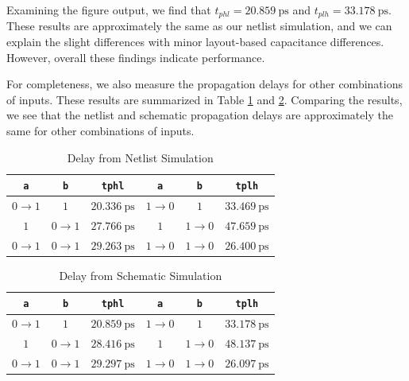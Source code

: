\documentclass{article}
\begin{document}
	\noindent Examining the figure output, we find that $t_{phl} = 20.859\ \text{ps}$ and $t_{plh} = 33.178\ \text{ps}$. These results are approximately the same as our netlist simulation, and we can explain the slight differences with minor layout-based capacitance differences. However, overall these findings indicate performance.
	
	For completeness, we also measure the propagation delays for other combinations of inputs. These results are summarized in Table \ref{table::nand_gate_delay_analysis} and \ref{table::nand_gate_delay_analysis_schem}. Comparing the results, we see that the netlist and schematic propagation delays are approximately the same for other combinations of inputs.
	 
	\begin{table}[H]
	\begin{center}
	\caption{Delay from Netlist Simulation}
	\label{table::nand_gate_delay_analysis}
	\begin{tabular}{| c | c | c || c | c | c |}
		\hline
		\texttt{a} & \texttt{b} & \texttt{tphl} & \texttt{a} & \texttt{b} & \texttt{tplh} \\
		\hline	
		$0 \rightarrow 1$ & $1$ & $20.336\ \text{ps}$ & $1 \rightarrow 0$ & $1$ & $33.469\ \text{ps}$\\
		\hline	
		$1$ & $0 \rightarrow 1$ & $27.766\ \text{ps}$ & $1$ & $1 \rightarrow 0$ & $47.659\ \text{ps}$\\
		\hline	
		$0 \rightarrow 1$ & $0 \rightarrow 1$ & $29.263\ \text{ps}$ & $1 \rightarrow 0$ & $1 \rightarrow 0$ & $26.400\ \text{ps}$\\
		\hline
	\end{tabular}
	\end{center}
	\end{table}
	
	\begin{table}[H]
	\begin{center}
	\caption{Delay from Schematic Simulation}
	\label{table::nand_gate_delay_analysis_schem}
	\begin{tabular}{| c | c | c || c | c | c |}
		\hline
		\texttt{a} & \texttt{b} & \texttt{tphl} & \texttt{a} & \texttt{b} & \texttt{tplh} \\
		\hline	
		$0 \rightarrow 1$ & $1$ & $20.859\ \text{ps}$ & $1 \rightarrow 0$ & $1$ & $33.178\ \text{ps}$\\
		\hline	
		$1$ & $0 \rightarrow 1$ & $28.416\ \text{ps}$ & $1$ & $1 \rightarrow 0$ & $48.137\ \text{ps}$\\
		\hline	
		$0 \rightarrow 1$ & $0 \rightarrow 1$ & $29.297\ \text{ps}$ & $1 \rightarrow 0$ & $1 \rightarrow 0$ & $26.097\ \text{ps}$\\
		\hline
	\end{tabular}
	\end{center}
	\end{table}
	
\end{document}
